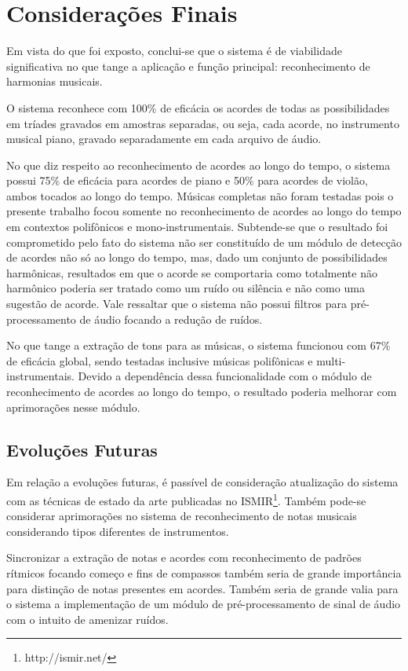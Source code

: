 \chapter{Considerações Finais}
\label{chap:conclusoes}

Em vista do que foi exposto, conclui-se que o sistema é de viabilidade significativa no que tange a aplicação e função principal: reconhecimento de harmonias musicais.

O sistema reconhece com 100\% de eficácia os acordes de todas as possibilidades em tríades gravados em amostras separadas, ou seja, cada acorde, no instrumento musical piano, gravado separadamente em cada arquivo de áudio.

No que diz respeito ao reconhecimento de acordes ao longo do tempo, o sistema possui 75\% de eficácia para acordes de piano e 50\% para acordes de violão, ambos tocados ao longo do tempo. Músicas completas não foram testadas pois o presente trabalho focou somente no reconhecimento de acordes ao longo do tempo em contextos polifônicos e mono-instrumentais. Subtende-se que o resultado foi comprometido pelo fato do sistema não ser constituído de um módulo de detecção de acordes não só ao longo do tempo, mas, dado um conjunto de possibilidades harmônicas, resultados em que o acorde se comportaria como totalmente não harmônico poderia ser tratado como um ruído ou silência e não como uma sugestão de acorde. Vale ressaltar que o sistema não possui filtros para pré-processamento de áudio focando a redução de ruídos.

No que tange a extração de tons para as músicas, o sistema funcionou com 67\% de eficácia global, sendo testadas inclusive músicas polifônicas e multi-instrumentais. Devido a dependência dessa funcionalidade com o módulo de reconhecimento de acordes ao longo do tempo, o resultado poderia melhorar com aprimorações nesse módulo. 

\section{Evoluções Futuras}

Em relação a evoluções futuras, é passível de consideração atualização do sistema com as técnicas de estado da arte publicadas no ISMIR\footnote{http://ismir.net/}. Também pode-se considerar aprimorações no sistema de reconhecimento de notas musicais considerando tipos diferentes de instrumentos.

Sincronizar a extração de notas e acordes com reconhecimento de padrões rítmicos focando começo e fins de compassos também seria de grande importância para distinção de notas presentes em acordes. Também seria de grande valia para o sistema a implementação de um módulo de pré-processamento de sinal de áudio com o intuito de amenizar ruídos.



